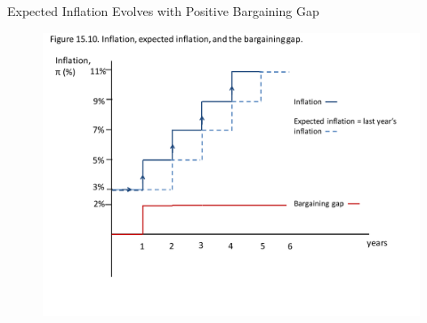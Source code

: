 \documentclass[11pt,aspectratio=43,usenames,dvipsnames]{beamer}
\theoremstyle{definition}
\begin{document}
\begin{frame}{Expected Inflation Evolves with Positive Bargaining Gap}
\label{slide:Expected_Inflation_Evolves_with_Positive_Bargaining_Gap}
    \begin{figure}
        \centering
        \includegraphics[width=\textwidth]{./figures/13.pdf}
    \end{figure}

\end{frame}
\end{document}
